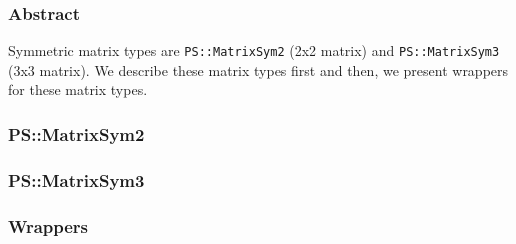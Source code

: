 \subsubsection{Abstract}

Symmetric matrix types are \texttt{PS::MatrixSym2} (2x2 matrix) and
\texttt{PS::MatrixSym3} (3x3 matrix). We describe these matrix types
first and then, we present wrappers for these matrix types.


\subsubsection{PS::MatrixSym2}



\subsubsection{PS::MatrixSym3}



\subsubsection{Wrappers}



